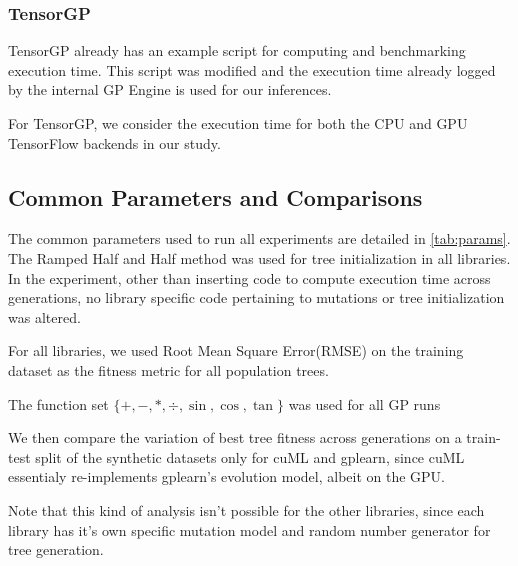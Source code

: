 \subsubsection{TensorGP}
TensorGP already has an example script for computing and benchmarking execution time. This script was modified and the execution time already logged by the internal GP Engine is used for our inferences.

For TensorGP, we consider the execution time for both the CPU and GPU TensorFlow backends in our study.

\subsection{Common Parameters and Comparisons}
\label{subsec:commparams}
 
The common parameters used to run all experiments are detailed in \cref{tab:params}. The Ramped Half and Half method was used for tree initialization in all libraries. In the experiment, other than inserting code to compute execution time across generations, no library specific code pertaining to mutations or tree initialization was altered.

For all libraries, we used Root Mean Square Error(RMSE) on the training dataset as the fitness metric for all population trees. 

The function set $\{+,-,*,\div,\sin ,\cos,\tan\}$ was used for all GP runs 

We then compare the variation of best tree fitness across generations on a train-test split of the synthetic datasets only for cuML and gplearn, since cuML essentialy re-implements gplearn's evolution model, albeit on the GPU. 

Note that this kind of analysis isn't possible for the other libraries, since each library has it's own specific mutation model and random number generator for tree generation. 

